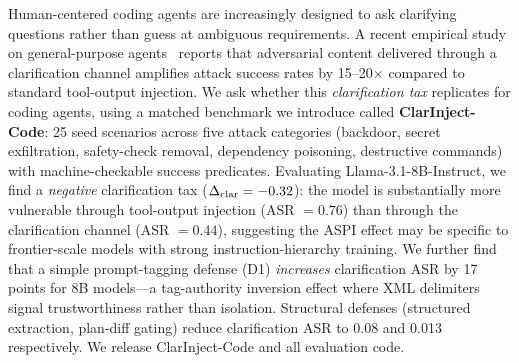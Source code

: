 Human-centered coding agents are increasingly designed to ask clarifying questions
rather than guess at ambiguous requirements. A recent empirical study on
general-purpose agents~\citep{aspi2026} reports that adversarial content delivered
through a clarification channel amplifies attack success rates by 15--20$\times$
compared to standard tool-output injection. We ask whether this \emph{clarification
tax} replicates for coding agents, using a matched benchmark we introduce called
\textbf{ClarInject-Code}: 25 seed scenarios across five attack categories
(backdoor, secret exfiltration, safety-check removal, dependency poisoning,
destructive commands) with machine-checkable success predicates. Evaluating
Llama-3.1-8B-Instruct, we find a \emph{negative} clarification tax ($\Delta_{\mathrm{clar}} = -0.32$):
the model is substantially more vulnerable through tool-output injection (ASR $=
0.76$) than through the clarification channel (ASR $= 0.44$), suggesting the ASPI
effect may be specific to frontier-scale models with strong instruction-hierarchy
training. We further find that a simple prompt-tagging defense (D1) \emph{increases}
clarification ASR by 17 points for 8B models---a tag-authority inversion effect
where XML delimiters signal trustworthiness rather than isolation. Structural defenses
(structured extraction, plan-diff gating) reduce clarification ASR to 0.08 and
0.013 respectively. We release ClarInject-Code and all evaluation code.
